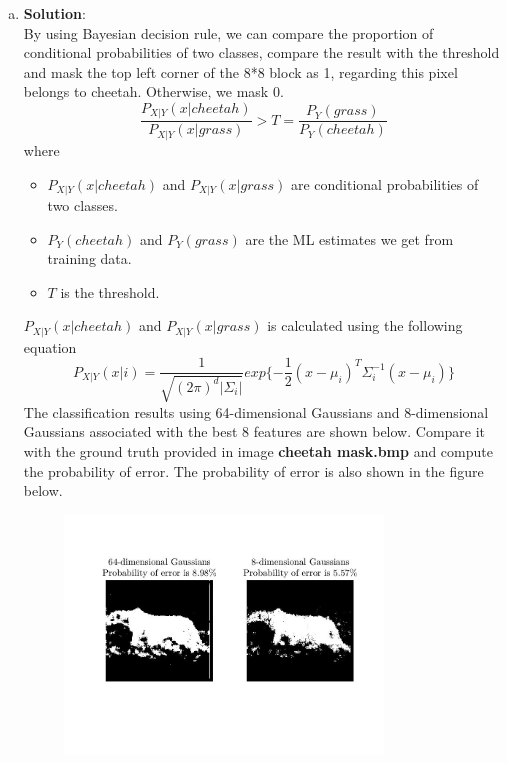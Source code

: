 \documentclass[12pt,letterpaper]{article}
\begin{document}
\begin{enumerate}[a)]
        \item  
        \textbf{Solution}:\\
        By using Bayesian decision rule, we can compare the proportion of conditional probabilities of two classes, compare the result with
        the threshold and mask the top left corner of the 8*8 block as 1, regarding this pixel belongs to cheetah. Otherwise, we mask 0.
        \begin{equation}
            \frac{P_{X|Y}(x|cheetah)}{P_{X|Y}(x|grass)} > T = \frac{P_Y(grass)}{P_Y(cheetah)} \nonumber
        \end{equation}
        where 
        \begin{itemize}
            \item[] $P_{X|Y}(x|cheetah)$ and $P_{X|Y}(x|grass)$ are conditional probabilities of two classes.
            \item[] $P_Y(cheetah)$ and $P_Y(grass)$ are the ML estimates we get from training data.
            \item[] $T$ is the threshold.
        \end{itemize}
        $P_{X|Y}(x|cheetah)$ and $P_{X|Y}(x|grass)$ is calculated using the following equation
        \begin{equation}
            P_{X|Y}(x|i)= \frac{1}{\sqrt{(2\pi)^d|\Sigma_i|}}exp\{-\frac{1}{2}(x-\mu_i)^T\Sigma_i^{-1}(x-\mu_i)\} \nonumber
        \end{equation}
        The classification results using 64-dimensional Gaussians and 8-dimensional Gaussians associated with the best 8 features
        are shown below. Compare it with the ground truth provided in image \textbf{cheetah mask.bmp} and compute the probability of error.
        The probability of error is also shown in the figure below.
        \begin{figure}[H]
            \centering 
            \includegraphics[width=0.8\textwidth]{Images/segmentation.jpg}

\end{figure}
\end{enumerate}
\end{document}
